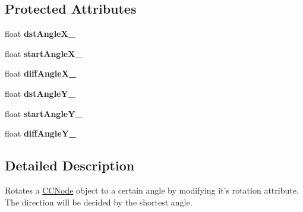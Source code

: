 \subsection*{Protected Attributes}
\begin{DoxyCompactItemize}
\item 
\hypertarget{interface_c_c_rotate_to_aabcc25eb1e4953492e2f5a08b4e2d827}{float {\bfseries dst\-Angle\-X\-\_\-}}\label{interface_c_c_rotate_to_aabcc25eb1e4953492e2f5a08b4e2d827}

\item 
\hypertarget{interface_c_c_rotate_to_a51d843f50d09363c1edd153c1a405f67}{float {\bfseries start\-Angle\-X\-\_\-}}\label{interface_c_c_rotate_to_a51d843f50d09363c1edd153c1a405f67}

\item 
\hypertarget{interface_c_c_rotate_to_ad30f3a858adc4ce8a733f2dcfdb0a5bb}{float {\bfseries diff\-Angle\-X\-\_\-}}\label{interface_c_c_rotate_to_ad30f3a858adc4ce8a733f2dcfdb0a5bb}

\item 
\hypertarget{interface_c_c_rotate_to_a9342d825487c4e1b79ce23ad49bfac6b}{float {\bfseries dst\-Angle\-Y\-\_\-}}\label{interface_c_c_rotate_to_a9342d825487c4e1b79ce23ad49bfac6b}

\item 
\hypertarget{interface_c_c_rotate_to_a6a857f28c882467c630a46db81ee5998}{float {\bfseries start\-Angle\-Y\-\_\-}}\label{interface_c_c_rotate_to_a6a857f28c882467c630a46db81ee5998}

\item 
\hypertarget{interface_c_c_rotate_to_aafb9bfe2d3c0c3842e08c8ffb77e4c10}{float {\bfseries diff\-Angle\-Y\-\_\-}}\label{interface_c_c_rotate_to_aafb9bfe2d3c0c3842e08c8ffb77e4c10}

\end{DoxyCompactItemize}


\subsection{Detailed Description}
Rotates a \hyperlink{class_c_c_node}{C\-C\-Node} object to a certain angle by modifying it's rotation attribute. The direction will be decided by the shortest angle. 

